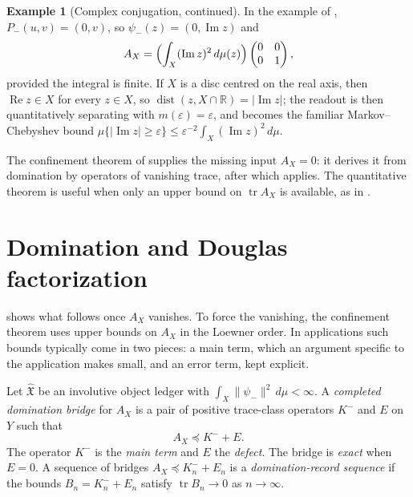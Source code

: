\documentclass[11pt]{article}
\DeclareMathOperator{\dist}{dist}
\DeclareMathOperator{\trace}{tr}
\newcommand{\Pminus}{P_{-}}
\newcommand{\psim}{\psi_{-}}
\newcommand{\AX}{A_{X}}
\newcommand{\Kminus}{K^{-}}
\newcommand{\IOL}{\hat{\mathfrak{X}}}
\theoremstyle{definition}
\newtheorem*{example}{Example}
\begin{document}
\begin{example}[Complex conjugation, continued]
In the example of ,
\(\Pminus(u,v)=(0,v)\), so \(\psim(z)=(0,\operatorname{Im}z)\) and
\[
  \AX=\Bigl(\int_X(\operatorname{Im}z)^2\,d\mu(z)\Bigr)
  \begin{pmatrix}0&0\\0&1\end{pmatrix},
\]
provided the integral is finite.  If \(X\) is a disc centred on the
real axis, then \(\operatorname{Re}z\in X\) for every \(z\in X\), so
\(\dist(z,X\cap\mathbb R)=|\operatorname{Im}z|\); the readout is then
quantitatively separating with \(m(\varepsilon)=\varepsilon\), and
 becomes the
familiar Markov--Chebyshev bound
\(\mu\{|\operatorname{Im}z|\geq\varepsilon\}\leq
\varepsilon^{-2}\int_X(\operatorname{Im}z)^2\,d\mu\).
\end{example}

The confinement theorem of  supplies the
missing input \(\AX=0\): it derives it from domination by operators of
vanishing trace, after which
 applies.  The
quantitative theorem is useful when only an upper bound on
\(\trace\AX\) is available, as in
.
 \section{Domination and Douglas factorization}
\label{sec:domination}

 shows what follows once \(\AX\) vanishes.
To force the vanishing, the confinement theorem uses upper bounds on
\(\AX\) in the Loewner order.  In applications such bounds typically
come in two pieces: a main term, which an argument specific to the
application makes small, and an error term, kept explicit.

\begin{definition}
\label{def:duality_confinement:completed-domination-bridge}
Let \(\IOL\) be an involutive object ledger with
\(\int_X\|\psim\|^2\,d\mu<\infty\).  A \emph{completed domination
bridge} for \(\AX\) is a pair of positive trace-class operators
\(\Kminus\) and \(E\) on \(Y\) such that
\[
  \AX\preceq\Kminus+E.
\]
The operator \(\Kminus\) is the \emph{main term} and \(E\) the
\emph{defect}.  The bridge is \emph{exact} when \(E=0\).  A sequence of
bridges \(\AX\preceq\Kminus_n+E_n\) is a \emph{domination-record
sequence} if the bounds \(B_n=\Kminus_n+E_n\) satisfy
\(\trace B_n\to0\) as \(n\to\infty\).
\end{definition}
\end{document}
